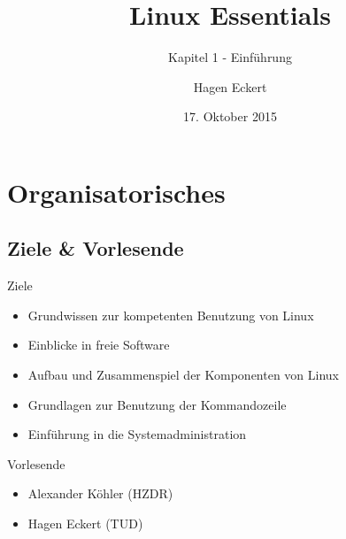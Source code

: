 \documentclass[aspectratio=43]{beamer}
\title[Linux Essentials  - Kapitel 1 - Einführung]{Linux Essentials}
\subtitle{Kapitel 1 - Einführung}
\author{Hagen Eckert}
\date{17. Oktober 2015}
\begin{document}
\logoframe

\frame{\titlepage}

\setcounter{tocdepth}{1}
\section[Gliederung]{}
\frame{\tableofcontents}


\section{Organisatorisches}
\subsection{Ziele \& Vorlesende}
\begin{frame} 

	\begin{block}{Ziele} 
	\begin{itemize}
	\item Grundwissen zur kompetenten Benutzung von Linux
	\item Einblicke in freie Software
	\item Aufbau und Zusammenspiel der Komponenten von Linux
	\item Grundlagen zur Benutzung der Kommandozeile
	\item Einführung in die Systemadministration
	\end{itemize}
	\end{block}
	
	\begin{block}{Vorlesende} 
	\begin{itemize}
	\item Alexander Köhler (HZDR)
	\item Hagen Eckert (TUD)
	\end{itemize}
	\end{block}

\end{frame}
\end{document}
